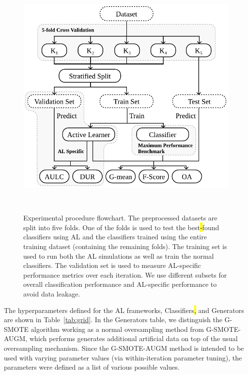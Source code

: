 \documentclass[preprint, 12pt]{elsarticle}
\begin{document}
\begin{figure}[H]
	\centering
	\includegraphics[width=.7\linewidth]{../analysis/experimental_procedure}
    \caption{%
        Experimental procedure flowchart. The preprocessed datasets are split
        into five folds. One of the folds is used to test the best\hl{-}found
        classifiers using AL and the classifiers trained using the entire
        training dataset (containing the remaining folds). The training set is
        used to run both the AL simulations as well as train the normal
        classifiers. The validation set is used to measure AL-specific
        performance metrics over each iteration. We use different subsets for
        overall classification performance and AL-specific performance to
        avoid data leakage.
    }~\label{fig:experimental_procedure}
\end{figure}

The hyperparameters defined for the AL frameworks, Classifiers\hl{,} and
Generators are shown in Table~\ref{tab:grid}. In the Generators table, we
distinguish the G-SMOTE algorithm working as a normal oversampling method from
G-SMOTE-AUGM, which performs generates additional artificial data on top of
the usual oversampling mechanism. Since the G-SMOTE-AUGM method is intended to
be used with varying parameter values (via within-iteration parameter tuning),
the parameters were defined as a list of various possible values.
\end{document}
